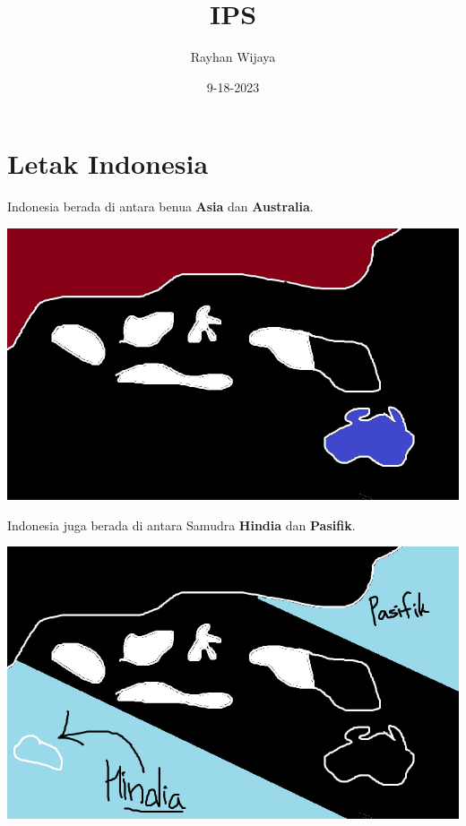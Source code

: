 \documentclass[12pt]{report}
\title{IPS}
\author{Rayhan Wijaya}
\date{9-18-2023}
\begin{document}
\maketitle

\section*{Letak Indonesia}

Indonesia berada di antara benua \textbf{Asia} dan \textbf{Australia}.

\includegraphics[scale=0.8]{indonesia-asia-australia}

Indonesia juga berada di antara Samudra \textbf{Hindia} dan \textbf{Pasifik}.

\includegraphics[scale=0.8]{indonesia-hindia-pasifik}
\end{document}
